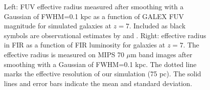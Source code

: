 \begin{figure}[!h]
\centering
\vskip -0.0cm
\hskip -1cm
\hskip -0cm
\vskip -0cm
\caption{%
Left:  FUV effective radius measured after smoothing with a Gaussian of FWHM=0.1 kpc
 as a function of GALEX FUV magnitude for simulated galaxies at $z=7$.
Included as black symbols are observational estimates by 
\citet[][circles]{2012Grazian}
and 
\citet[][triangles]{2012Ono}.
Right:  effective radius in FIR as a function of FIR luminosity for galaxies at $z=7$.
The effective radius is measured on MIPS 70 $\mu$m band images after smoothing with a Gaussian of FWHM=0.1 kpc.
The dotted line marks the effective resolution of our simulation (75 pc). 
The solid lines and error bars indicate the mean and standard deviation.
}
\label{fig:re}
\end{figure}



